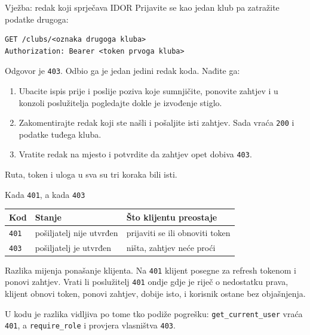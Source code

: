 \begin{frame}[fragile]{Vježba: redak koji sprječava IDOR}
Prijavite se kao jedan klub pa zatražite podatke drugoga:

\begin{lstlisting}
GET /clubs/<oznaka drugoga kluba>
Authorization: Bearer <token prvoga kluba>
\end{lstlisting}

\vspace{0.5em}
Odgovor je \texttt{403}. Odbio ga je jedan jedini redak koda. Nađite ga:

\vspace{0.6em}
\begin{enumerate}
  \itemsep0.5em
  \item Ubacite ispis prije i poslije poziva koje sumnjičite, ponovite zahtjev i u konzoli poslužitelja pogledajte dokle je izvođenje stiglo.
  \item Zakomentirajte redak koji ste našli i pošaljite isti zahtjev. Sada vraća \texttt{200} i podatke tuđega kluba.
  \item Vratite redak na mjesto i potvrdite da zahtjev opet dobiva \texttt{403}.
\end{enumerate}

\vspace{0.7em}
Ruta, token i uloga u sva su tri koraka bili isti.
\end{frame}


\begin{frame}{Kada \texttt{401}, a kada \texttt{403}}
\begin{center}
{\small
\setlength{\tabcolsep}{8pt}
\renewcommand{\arraystretch}{1.4}
\begin{tabular}{@{}lll@{}}
  \toprule
  \textbf{Kod} & \textbf{Stanje} & \textbf{Što klijentu preostaje} \\
  \midrule
  \texttt{401} & pošiljatelj nije utvrđen   & prijaviti se ili obnoviti token \\
  \texttt{403} & pošiljatelj je utvrđen     & ništa, zahtjev neće proći \\
  \bottomrule
\end{tabular}
}
\end{center}

\vspace{0.6em}
Razlika mijenja ponašanje klijenta. Na \texttt{401} klijent posegne za refresh tokenom i ponovi zahtjev. Vrati li poslužitelj \texttt{401} ondje gdje je riječ o nedostatku prava, klijent obnovi token, ponovi zahtjev, dobije isto, i korisnik ostane bez objašnjenja.

\vspace{0.3em}
U kodu je razlika vidljiva po tome tko podiže pogrešku: \texttt{get\_current\_user} vraća \texttt{401}, a \texttt{require\_role} i provjera vlasništva \texttt{403}.
\end{frame}

